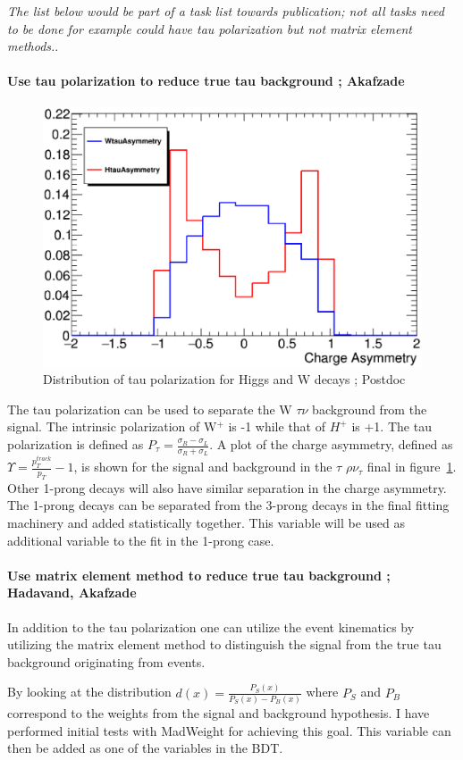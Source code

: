 {\it The list below would be part of a task list towards publication; not all tasks need to be done for example could have tau polarization but not matrix element methods.}.

\paragraph{Use tau polarization to reduce true tau background ; Akafzade}
\begin{figure}\label{fig:plot1}
\begin{center}
\includegraphics[height=0.32\textwidth]{Haleh/tauAsy.eps}
\caption{Distribution of tau polarization for Higgs and W decays ;  Postdoc}
\label{fig:tau}
\end{center}
\end{figure}
The tau polarization can be used to separate the W \too $\tau \nu$ background from the signal.  The intrinsic polarization of W$^+$ is -1 while that of $H^+$ is +1.  The tau polarization is defined as $P_{\tau}=\frac{\sigma_R - \sigma_L}{\sigma_R + \sigma_L}$.
A plot of the charge asymmetry, defined as $\Upsilon=\frac{p_{T}^{track}}{p_T} - 1$, is shown for the signal and background in the $\tau$ \too $\rho \nu_{\tau}$ final in figure~\ref{fig:tau}. Other 1-prong decays will also have similar separation in the charge asymmetry. 
The 1-prong decays can be separated from the 3-prong decays in the final fitting machinery and added statistically together.  This variable will be used as additional variable to the fit in the 1-prong case.

\paragraph{Use matrix element method to reduce true tau background ;  Hadavand, Akafzade}
In addition to the tau polarization one can utilize the event kinematics by utilizing the matrix element method to distinguish the signal from the true tau background originating from \ttbar events.  

By looking at the distribution $d(x)=\frac{P_S(x)}{P_S(x)-P_B(x)}$ where $P_S$ and $P_B$ correspond to the weights from the signal and background 
hypothesis. I have performed initial tests with MadWeight for achieving this goal. This variable can then be added as one of the variables in the BDT. 

